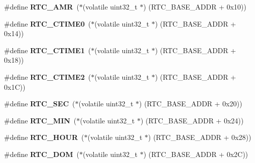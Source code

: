 \begin{DoxyCompactItemize}
\#define {\bfseries R\+T\+C\+\_\+\+A\+MR}~($\ast$(volatile uint32\+\_\+t $\ast$) (R\+T\+C\+\_\+\+B\+A\+S\+E\+\_\+\+A\+D\+DR + 0x10))
\item 
\mbox{\label{group__lpc24xx__regs_ga89830979584d5211afebed1fffa4f26b}} 
\#define {\bfseries R\+T\+C\+\_\+\+C\+T\+I\+M\+E0}~($\ast$(volatile uint32\+\_\+t $\ast$) (R\+T\+C\+\_\+\+B\+A\+S\+E\+\_\+\+A\+D\+DR + 0x14))
\item 
\mbox{\label{group__lpc24xx__regs_ga5b5b420362d3d8573f13b5a99c378be7}} 
\#define {\bfseries R\+T\+C\+\_\+\+C\+T\+I\+M\+E1}~($\ast$(volatile uint32\+\_\+t $\ast$) (R\+T\+C\+\_\+\+B\+A\+S\+E\+\_\+\+A\+D\+DR + 0x18))
\item 
\mbox{\label{group__lpc24xx__regs_gaa5dd5f757aff1f88bc8ebd4fa1188afc}} 
\#define {\bfseries R\+T\+C\+\_\+\+C\+T\+I\+M\+E2}~($\ast$(volatile uint32\+\_\+t $\ast$) (R\+T\+C\+\_\+\+B\+A\+S\+E\+\_\+\+A\+D\+DR + 0x1\+C))
\item 
\mbox{\label{group__lpc24xx__regs_ga2507e650d4ccc8a2bdf3001800a3e743}} 
\#define {\bfseries R\+T\+C\+\_\+\+S\+EC}~($\ast$(volatile uint32\+\_\+t $\ast$) (R\+T\+C\+\_\+\+B\+A\+S\+E\+\_\+\+A\+D\+DR + 0x20))
\item 
\mbox{\label{group__lpc24xx__regs_ga34fc4e7c0e5db231217aa3174e394c72}} 
\#define {\bfseries R\+T\+C\+\_\+\+M\+IN}~($\ast$(volatile uint32\+\_\+t $\ast$) (R\+T\+C\+\_\+\+B\+A\+S\+E\+\_\+\+A\+D\+DR + 0x24))
\item 
\mbox{\label{group__lpc24xx__regs_ga7264eac87ffc91cbdea1239d346a0ea4}} 
\#define {\bfseries R\+T\+C\+\_\+\+H\+O\+UR}~($\ast$(volatile uint32\+\_\+t $\ast$) (R\+T\+C\+\_\+\+B\+A\+S\+E\+\_\+\+A\+D\+DR + 0x28))
\item 
\mbox{\label{group__lpc24xx__regs_ga13fe5c7a2fcd0e19ebfa0dec6effae15}} 
\#define {\bfseries R\+T\+C\+\_\+\+D\+OM}~($\ast$(volatile uint32\+\_\+t $\ast$) (R\+T\+C\+\_\+\+B\+A\+S\+E\+\_\+\+A\+D\+DR + 0x2\+C))
\item 
\mbox{\label{group__lpc24xx__regs_gae55d2c94800cef20cab58b193e7ddb40}} 

\end{DoxyCompactItemize}
